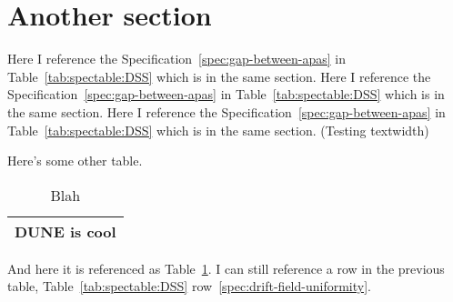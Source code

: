 \documentclass{article}
\begin{document}
\section{Another section}


Here I reference the Specification~\ref{spec:gap-between-apas} in Table~\ref{tab:spectable:DSS} which is in the same section. Here I reference the Specification~\ref{spec:gap-between-apas} in Table~\ref{tab:spectable:DSS} which is in the same section. Here I reference the Specification~\ref{spec:gap-between-apas} in Table~\ref{tab:spectable:DSS} which is in the same section. (Testing textwidth)


Here's some other table.

\begin{table}[htp]
  \caption{Blah}
  \centering
  \begin{tabular}{|c|}
    \hline
    \label{row:cool} DUNE is cool \\
    \hline
  \end{tabular}
  \label{tab:cool}
\end{table}

And here it is referenced as Table~\ref{tab:cool}.  
I can still reference a row in the previous table,
Table~\ref{tab:spectable:DSS}
row~\ref{spec:drift-field-uniformity}.
\end{document}
